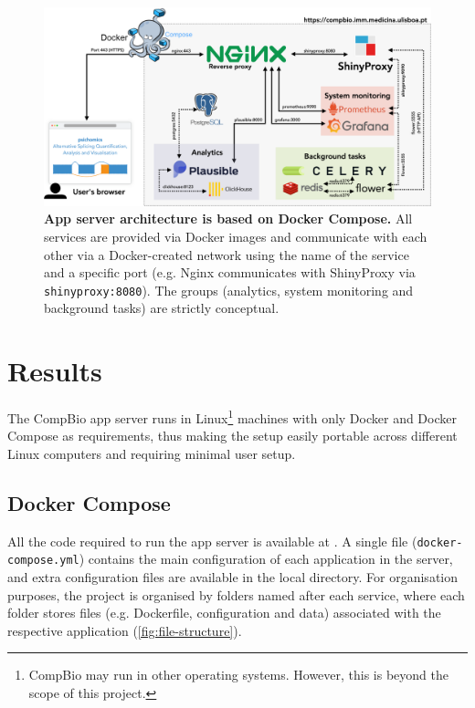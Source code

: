 \begin{figure}[!t]
  \includegraphics[width=.9\textwidth]{images/app-server/architecture}
  \centering
  \caption[App server architecture]{\textbf{App server architecture is based on Docker Compose.} All services are provided via Docker images and communicate with each other via a Docker-created network using the name of the service and a specific port (e.g. Nginx communicates with ShinyProxy via \texttt{shinyproxy:8080}). The groups  (analytics, system monitoring and background tasks) are strictly conceptual.}
  \label{fig:architecture}
\end{figure}

\section{Results}

The CompBio app server runs in Linux\footnote{CompBio may run in other operating systems. However, this is beyond the scope of this project.} machines with only Docker and Docker Compose as requirements, thus making the setup easily portable across different Linux computers and requiring minimal user setup.

\subsection{Docker Compose}

All the code required to run the app server is available at . A single file (\texttt{docker-compose.yml}) contains the main configuration of each application in the server, and extra configuration files are available in the local directory. For organisation purposes, the project is organised by folders named after each service, where each folder stores files (e.g. Dockerfile, configuration and data) associated with the respective application (\autoref{fig:file-structure}).


